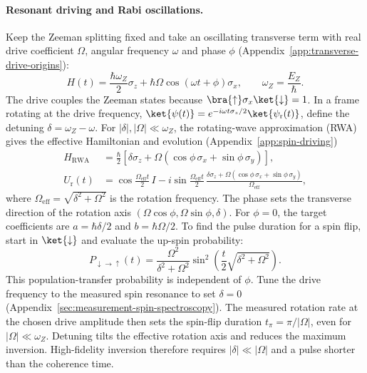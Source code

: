 \paragraph{Resonant driving and Rabi oscillations.}
Keep the Zeeman splitting fixed and take an oscillating transverse
term with real drive coefficient $\Omega$, angular frequency
$\omega$ and phase $\phi$ (Appendix~\ref{app:transverse-drive-origins}):
\begin{equation}
  H(t)=\frac{\hbar\omega_Z}{2}\sigma_z
       +\hbar\Omega\cos(\omega t+\phi)\sigma_x,
  \qquad \omega_Z=\frac{E_Z}{\hbar}.
  \label{eq:esr-lab}
\end{equation}
The drive couples the Zeeman states because
$\bra{\uparrow}\sigma_x\ket{\downarrow}=1$.
In a frame rotating at the drive frequency,
$\ket{\psi(t)}=e^{-i\omega t\sigma_z/2}\ket{\psi_{\mathrm r}(t)}$,
define the detuning $\delta=\omega_Z-\omega$.
For $|\delta|,|\Omega|\ll\omega_Z$, the rotating-wave approximation
(RWA) gives the effective Hamiltonian and evolution
(Appendix~\ref{app:spin-driving})
\begin{equation}
  \begin{aligned}
    H_{\mathrm{RWA}}&=\frac{\hbar}{2}
      \left[\delta\sigma_z
        +\Omega(\cos\phi\,\sigma_x+\sin\phi\,\sigma_y)\right],\\
    U_{\mathrm r}(t)&=\cos\frac{\Omega_{\mathrm{eff}}t}{2}\,I
      -i\sin\frac{\Omega_{\mathrm{eff}}t}{2}\,
       \frac{\delta\sigma_z
         +\Omega(\cos\phi\,\sigma_x+\sin\phi\,\sigma_y)}
            {\Omega_{\mathrm{eff}}},
  \end{aligned}
  \label{eq:esr-propagator}
\end{equation}
where $\Omega_{\mathrm{eff}}=\sqrt{\delta^2+\Omega^2}$ is the rotation
frequency. The phase sets the transverse direction of the rotation
axis $(\Omega\cos\phi,\Omega\sin\phi,\delta)$. For $\phi=0$,
the target coefficients are $a=\hbar\delta/2$ and $b=\hbar\Omega/2$.
To find the pulse duration for a spin flip, start in
$\ket{\downarrow}$ and evaluate the up-spin probability:
\begin{equation}
  P_{\downarrow\to\uparrow}(t)
    =\frac{\Omega^2}{\delta^2+\Omega^2}
       \sin^2\!\left(\frac{t}{2}\sqrt{\delta^2+\Omega^2}\right).
  \label{eq:rabi-probability}
\end{equation}
This population-transfer probability is independent of $\phi$.
Tune the drive frequency to the measured spin resonance to set
$\delta=0$ (Appendix~\ref{sec:measurement-spin-spectroscopy}).
The measured rotation rate at the chosen drive amplitude then sets
the spin-flip duration $t_\pi=\pi/|\Omega|$, even for
$|\Omega|\ll\omega_Z$.
Detuning tilts the effective rotation axis and reduces the maximum
inversion. High-fidelity inversion therefore requires
$|\delta|\ll|\Omega|$ and a pulse shorter than the coherence time.

